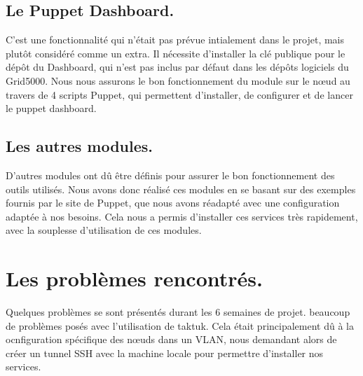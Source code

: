 \documentclass[a4paper,10pt]{article}
\begin{document}
			\subsection{Le Puppet Dashboard.}
			C'est une fonctionnalité qui n'était pas prévue intialement dans le projet, mais plut\^ot considéré comme un extra.
			Il nécessite d'installer la clé publique pour le dép\^ot du Dashboard, qui n'est pas inclus par défaut dans les dép\^ots logiciels du Grid5000.
			Nous nous assurons le bon fonctionnement du module sur le n\oe ud au travers de 4 scripts Puppet, qui permettent d'installer, de configurer et de lancer le puppet dashboard.
			\subsection{Les autres modules.}
			D'autres modules ont d\^u \^etre définis pour assurer le bon fonctionnement des outils utilisés. Nous avons donc réalisé ces modules en se basant sur des exemples fournis par le site de Puppet, que nous avons réadapté avec une configuration adaptée à nos besoins. Cela nous a permis d'installer ces services très rapidement, avec la souplesse d'utilisation de ces modules.
			\section{Les problèmes rencontrés.}
			Quelques problèmes se sont présentés durant les 6 semaines de projet. beaucoup de problèmes posés avec l'utilisation de taktuk. Cela était principalement d\^u à la ocnfiguration spécifique des n\oe uds dans un VLAN, nous demandant alors de créer un tunnel SSH avec la machine locale pour permettre d'installer nos services.
\end{document}
